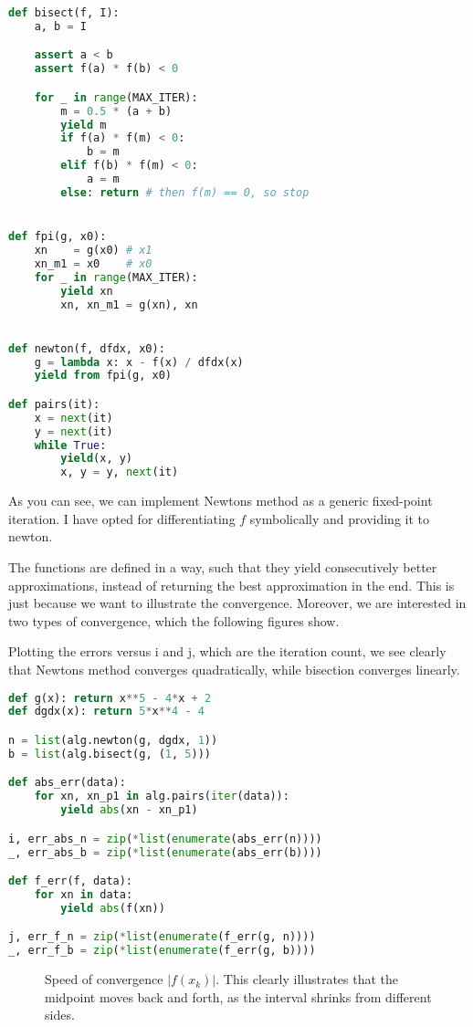 \documentclass[12pt]{article}
\begin{document}
\begin{multicols}{2}
\begin{lstlisting}[language=Python, caption={Bisection and Newtons method}]
def bisect(f, I):
    a, b = I

    assert a < b
    assert f(a) * f(b) < 0

    for _ in range(MAX_ITER):
        m = 0.5 * (a + b)
        yield m
        if f(a) * f(m) < 0:
            b = m
        elif f(b) * f(m) < 0:
            a = m
        else: return # then f(m) == 0, so stop


def fpi(g, x0):
    xn    = g(x0) # x1
    xn_m1 = x0    # x0
    for _ in range(MAX_ITER):
        yield xn
        xn, xn_m1 = g(xn), xn


def newton(f, dfdx, x0):
    g = lambda x: x - f(x) / dfdx(x)
    yield from fpi(g, x0)

def pairs(it):
    x = next(it)
    y = next(it)
    while True:
        yield(x, y)
        x, y = y, next(it)
\end{lstlisting}
As you can see, we can implement Newtons method
as a generic fixed-point iteration.
I have opted for differentiating $f$ symbolically
and providing it to {\ttfamily newton}.

The functions are defined in a way, such that they
yield consecutively better approximations, instead
of returning the best approximation in the end.
This is just because we want to illustrate the convergence.
Moreover, we are interested in two types of convergence,
which the following figures show.

Plotting the errors versus {\ttfamily i} and {\ttfamily j},
which are the iteration count,
we see clearly that Newtons method converges quadratically,
while bisection converges linearly.

\begin{lstlisting}[language=Python, caption={Comparing the two methods}]
def g(x): return x**5 - 4*x + 2
def dgdx(x): return 5*x**4 - 4

n = list(alg.newton(g, dgdx, 1))
b = list(alg.bisect(g, (1, 5)))

def abs_err(data):
    for xn, xn_p1 in alg.pairs(iter(data)):
        yield abs(xn - xn_p1)

i, err_abs_n = zip(*list(enumerate(abs_err(n))))
_, err_abs_b = zip(*list(enumerate(abs_err(b))))

def f_err(f, data):
    for xn in data:
        yield abs(f(xn))

j, err_f_n = zip(*list(enumerate(f_err(g, n))))
_, err_f_b = zip(*list(enumerate(f_err(g, b))))
\end{lstlisting}
\begin{figure}[H]
\centering

\caption{
    Speed of convergence $|f(x_k)|$.
    This clearly illustrates that the midpoint moves back and forth,
    as the interval shrinks from different sides.
}
\end{figure}
\noindent


\end{multicols}
\end{document}
